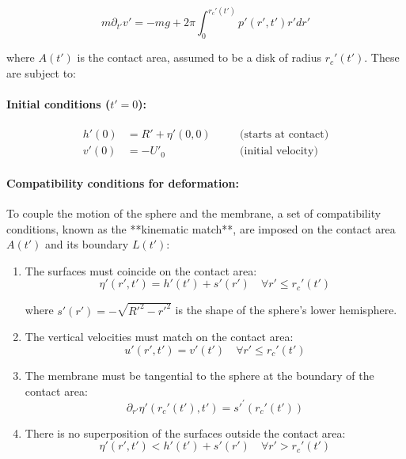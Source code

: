 \documentclass{article}
\begin{document}
\begin{equation}
    m \partial_{t'}v' = -mg + 2\pi \int_{0}^{r_c'(t')} p'(r', t') r' dr'
\end{equation}

where $A(t')$ is the contact area, assumed to be a disk of radius $r_c'(t')$. These are subject to:

\paragraph{Initial conditions ($t'=0$):}
\begin{align}
    h'(0) &= R' + \eta'(0, 0) \quad &&\text{(starts at contact)} \label{eq:ic_h} \\
    v'(0) &= -U'_0 \quad &&\text{(initial velocity)} \label{eq:ic_v}
\end{align}

\paragraph{Compatibility conditions for deformation:} 
To couple the motion of the sphere and the membrane, a set of compatibility conditions, known as the **kinematic match**, are imposed on the contact area $A(t')$ and its boundary $L(t')$:
\begin{enumerate}
    \item The surfaces must coincide on the contact area:
    \begin{equation}
        \eta'(r', t') = h'(t') + s'(r') \quad \forall r' \le r_c'(t') 
    \end{equation}
    
    where $s'(r') = -\sqrt{R'^2 - r'^2}$ is the shape of the sphere's lower hemisphere.
    
    \item The vertical velocities must match on the contact area:
    \begin{equation}
        u'(r', t') = v'(t') \quad \forall r' \le r_c'(t')
    \end{equation}
    
    \item The membrane must be tangential to the sphere at the boundary of the contact area:
    \begin{equation}
        \partial_{r'}\eta'(r_c'(t'), t') = s'^{\prime}(r_c'(t'))
    \end{equation}
    
    \item There is no superposition of the surfaces outside the contact area:
    \begin{equation}
        \eta'(r', t') < h'(t') + s'(r') \quad \forall r' > r_c'(t')
    \end{equation}
    
\end{enumerate}
\end{document}
